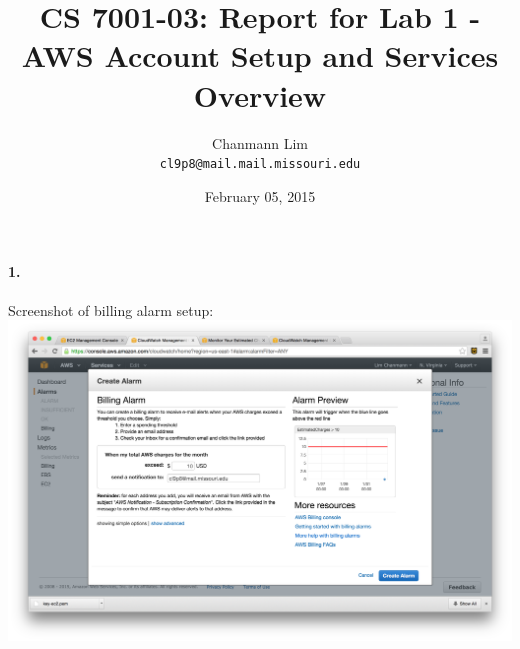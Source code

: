 \documentclass[a4paper]{article}
\begin{document}
\title{CS 7001-03: Report for Lab 1 - AWS Account Setup and Services Overview}
\author{Chanmann Lim\\ 
	\texttt{cl9p8@mail.mail.missouri.edu}}
\date{February 05, 2015}
\maketitle

\paragraph{1. } Screenshot of billing alarm setup: \\
\includegraphics[scale=.32]{billing_alarm.png} \\
\end{document}

